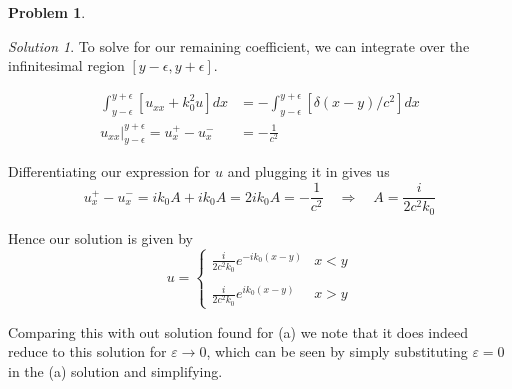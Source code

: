 \documentclass[12pt,a4paper]{article}
\theoremstyle{definition}
\newtheorem{problem}{Problem}
\theoremstyle{remark}
\newtheorem*{solution}{Solution}
\begin{document}
\begin{problem}
\begin{enumerate}[label=(\alph*)]
\begin{solution}
            To solve for our remaining coefficient, we can integrate over the infinitesimal region $[y-\epsilon, y+\epsilon]$.

            \begin{align*}
                \int_{y-\epsilon}^{y+\epsilon} \left[ u_{xx} + k_0^2 u \right]dx &= -\int_{y-\epsilon}^{y+\epsilon} \left[ \delta(x-y)/c^2 \right]dx \\
                u_{xx} \Big|_{y-\epsilon}^{y+\epsilon} = u_x^+ - u_x^- &= - \frac{1}{c^2}
            \end{align*}

            Differentiating our expression for $u$ and plugging it in gives us $$u_x^+ - u_x^- = ik_0 A + ik_0 A = 2i k_0 A = - \frac{1}{c^2} \quad \Rightarrow \quad A = \frac{i}{2c^2 k_0}$$

            Hence our solution is given by $$u = \begin{cases}
                \frac{i}{2c^2 k_0} e^{-ik_0 (x-y)} & x< y \\\\
                \frac{i}{2c^2 k_0} e^{ik_0 (x-y)} & x > y
            \end{cases}$$

            Comparing this with out solution found for (a) we note that it does indeed reduce to this solution for $\varepsilon \rightarrow 0$, which can be seen by simply substituting $\varepsilon = 0$ in the (a) solution and simplifying.
        \end{solution}
    \end{enumerate}
\end{problem}
\end{document}
